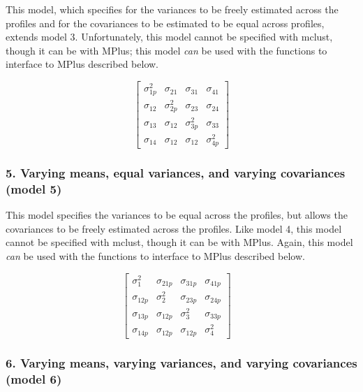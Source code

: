 \documentclass[]{book}
\theoremstyle{definition}
\theoremstyle{definition}
\theoremstyle{definition}
\theoremstyle{remark}
\begin{document}
This model, which specifies for the variances to be freely estimated
across the profiles and for the covariances to be estimated to be equal
across profiles, extends model 3. Unfortunately, this model cannot be
specified with mclust, though it can be with MPlus; this model
\emph{can} be used with the functions to interface to MPlus described
below.

\[
\left[ \begin{matrix} { \sigma  }_{ 1p }^{ 2 } & { \sigma  }_{ 21 } & { \sigma  }_{ 31 } & { \sigma  }_{ 41 } \\ { \sigma  }_{ 12 } & { \sigma  }_{ 2p }^{ 2 } & { \sigma  }_{ 23 } & { \sigma  }_{ 24 } \\ { \sigma  }_{ 13 } & { \sigma  }_{ 12 } & { \sigma  }_{ 3p }^{ 2 } & { \sigma  }_{ 33 } \\ { \sigma  }_{ 14 } & { \sigma  }_{ 12 } & { \sigma  }_{ 12 } & { \sigma  }_{ 4p }^{ 2 } \end{matrix} \right] 
\]

\subsubsection{5. Varying means, equal variances, and varying
covariances (model
5)}\label{varying-means-equal-variances-and-varying-covariances-model-5}

This model specifies the variances to be equal across the profiles, but
allows the covariances to be freely estimated across the profiles. Like
model 4, this model cannot be specified with mclust, though it can be
with MPlus. Again, this model \emph{can} be used with the functions to
interface to MPlus described below.

\[
\left[ \begin{matrix} { \sigma  }_{ 1 }^{ 2 } & { \sigma  }_{ 21p } & { \sigma  }_{ 31p } & { \sigma  }_{ 41p } \\ { \sigma  }_{ 12p } & { \sigma  }_{ 2 }^{ 2 } & { \sigma  }_{ 23p } & { \sigma  }_{ 24p } \\ { \sigma  }_{ 13p } & { \sigma  }_{ 12p } & { \sigma  }_{ 3 }^{ 2 } & { \sigma  }_{ 33p } \\ { \sigma  }_{ 14p } & { \sigma  }_{ 12p } & { \sigma  }_{ 12p } & { \sigma  }_{ 4 }^{ 2 } \end{matrix} \right] \quad 
\]

\subsubsection{6. Varying means, varying variances, and varying
covariances (model
6)}\label{varying-means-varying-variances-and-varying-covariances-model-6}
\end{document}

